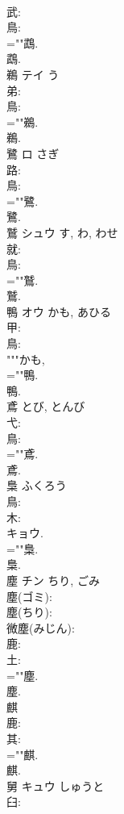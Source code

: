 \documentclass[8pt]{extreport}
\begin{document}
\begin{CJK}{UTF8}{min}
\\	武: 
\\	鳥: 
\\	=""鵡.
\\	鵡.
\\	鵜	テイ	う		
\\	弟: 
\\	鳥: 
\\	=""鵜.
\\	鵜.
\\	鷺	ロ	さぎ		
\\	路: 
\\	鳥: 
\\	=""鷺.
\\	鷺.
\\	鷲	シュウ		す, わ, わせ	
\\	就: 
\\	鳥: 
\\	=""鷲.
\\	鷲.
\\	鴨	オウ	かも, あひる		
\\	甲: 
\\	鳥: 
\\	"""かも, 
\\	=""鴨.
\\	鴨.
\\	鳶		とび, とんび				
\\	弋: 
\\	鳥: 
\\	=""鳶.
\\	鳶.
\\	梟		ふくろう				
\\	鳥: 
\\	木: 
\\	キョウ.
\\	=""梟.
\\	梟.
\\	塵	チン	ちり, ごみ		
\\	塵(ゴミ): 
\\	塵(ちり): 
\\	微塵(みじん): 
\\	鹿: 
\\	土: 
\\	=""塵.
\\	塵.
\\	麒						
\\	鹿: 
\\	其: 
\\	=""麒.
\\	麒.
\\	舅	キュウ	しゅうと		
\\	臼: 

\end{CJK}
\end{document}

